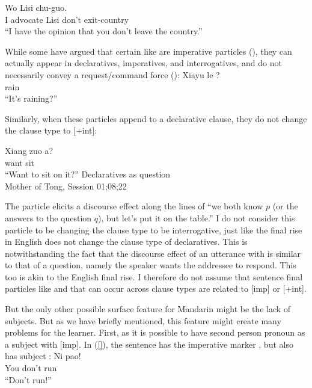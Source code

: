 \gll Wo  Lisi  chu-guo.\\
I advocate Lisi don't exit-country\\
\trans ``I have the opinion that you don't leave the country.'' \hfill \textcite[p.458]{lithompson}
\eex

While some have argued that certain  like  are imperative particles (\cite{zhudexi,chao1968,lithompson}), they can actually appear in declaratives, imperatives, and interrogatives, and do not necessarily convey a request/command force (\cite{hanyang1995,liboya2006,ettingermalamud2014,YY2021}):
\gll Xiayu le ?\\
rain \Asp{} \Sfp{}\\
\trans ``It's raining?''
\eex

Similarly, when these particles append to a declarative clause, they do not change the clause type to [+int]:

\gll %
Xiang zuo a?\\
want sit \Sfp{}\\
``Want to sit on it?''
\hfill Declaratives as question\\
\hspace*{\fill} Mother of Tong, Session 01;08;22
\eex

The particle  elicits a discourse effect along the lines of ``we both know $p$ (or the answers to the question $q$), but let's put it on the table.'' I do not consider this particle to be changing the clause type to be interrogative, just like the final rise in English does not change the clause type of declaratives. This is notwithstanding the fact that the discourse effect of an utterance with  is similar to that of a question, namely the speaker wants the addressee to respond. This too is akin to the English final rise.
I therefore do not assume that sentence final particles like  and  that can occur across clause types are related to [imp] or [+int].


But the only other possible surface feature for Mandarin might be the lack of subjects. But as we have briefly mentioned, this feature might create many problems for the learner. First, as it is possible to have second person pronoun as a subject with [imp]. In (\ref{}), the sentence has the imperative marker , but also has subject :
\gll Ni  pao!\\
You don't run\\
``Don't run!''
\eex 

